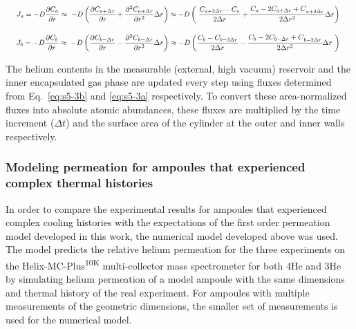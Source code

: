 \begin{equation}
\resizebox{0.98\linewidth}{!}{$\displaystyle
J_{a} = - D\frac{\partial C_{a}}{\partial r} \approx \  - D\left( \frac{\partial C_{a + \Delta r}}{\partial r} + \frac{\partial^{2}C_{a + \Delta r}}{\partial r^{2}}\Delta r \right) \approx - D\left( \ \frac{C_{a + 2\Delta r} - C_{a}}{2\Delta r} + \frac{C_{a} - {2C_{a + \Delta r} + C}_{a + 2\Delta r}}{2\Delta r^{2}}\Delta r \right)\
$}
\label{eq:s5-3a}
\end{equation}

\begin{equation}
\resizebox{0.98\linewidth}{!}{$\displaystyle
J_{b} = - D\frac{\partial C_{b}}{\partial r} \approx \  - D\left( \frac{\partial C_{b - \Delta r}}{\partial r} - \frac{\partial^{2}C_{b - \Delta r}}{\partial r^{2}}\Delta r \right) \approx - D\left( \frac{C_{b} - C_{b - 2\Delta r}}{2\Delta r} - \frac{C_{b} - {2C_{b - \Delta r} + C}_{b - 2\Delta r}}{2\Delta r^{2}}\Delta r\  \right)\
$}
\label{eq:s5-3b}
\end{equation}

The helium contents in the measurable (external, high vacuum) reservoir
and the inner encapsulated gas phase are updated every step using fluxes
determined from Eq.~\eqref{eq:s5-3b} and \eqref{eq:s5-3a} respectively. To convert these
area-normalized fluxes into absolute atomic abundances, these fluxes are
multiplied by the time increment ($\Delta t$) and the surface area of the
cylinder at the outer and inner walls respectively.

\subsubsection{Modeling permeation for ampoules that experienced complex
thermal
histories}\label{modeling-permeation-for-ampoules-that-experienced-complex-thermal-histories}

In order to compare the experimental results for ampoules that
experienced complex cooling histories with the expectations of the first
order permeation model developed in this work, the numerical model
developed above was used. The model predicts the relative helium
permeation for the three experiments on the
Helix-MC-Plus\textsuperscript{10K} multi-collector mass spectrometer for
both 4He and 3He by simulating helium permeation of a model ampoule with
the same dimensions and thermal history of the real experiment. For
ampoules with multiple measurements of the geometric dimensions, the
smaller set of measurements is used for the numerical model.

